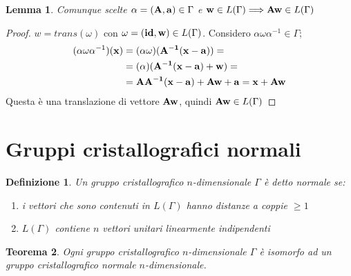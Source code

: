 \documentclass[a4paper,11pt,openright,twoside	]{book}
\newtheorem{definition}{Definizione}[section]
\newtheorem{theorem}{Teorema}[section]
\newtheorem{lemma}[theorem]{Lemma}
\begin{document}
\begin{lemma}
\label{lemma:aw}
Comunque scelte $\alpha = (\vb{A, a}) \in \Gamma$ e $\vb{w} \in L(\Gamma) \Longrightarrow \vb{Aw} \in L(\Gamma)$ 
\end{lemma}

\begin{proof}
$w = trans(\omega)$ con $\omega = (\vb{id, w}	) \in L(\Gamma)$. 
Considero $\alpha \omega \alpha^{-1} \in \Gamma$; 
\[ \begin{split}
( \alpha \omega \alpha^{-1} )(\vb{x}) & = ( \alpha \omega)(\vb{A^{-1}(x-a)}) = \\
& =  ( \alpha  )(\vb{A^{-1}(x-a)} + \vb{w}) = \\
& = \vb{AA^{-1}(x-a)} + \vb{Aw} + \vb{a} = \vb{x} + \vb{Aw} 
\end{split}\] 
Questa è una translazione di vettore $\vb{Aw}$, quindi $\vb{Aw} \in L(\Gamma)$
\end{proof}


\section{Gruppi cristallografici normali}

\begin{definition}
Un gruppo cristallografico $n$-dimensionale $\Gamma$ è detto normale se:
\begin{enumerate}
\item i vettori che sono contenuti in $L(\Gamma)$ hanno distanze a coppie $\geq 1$
\item $L(\Gamma)$ contiene $n$ vettori unitari linearmente indipendenti
\end{enumerate}
\end{definition}


\begin{theorem}
Ogni gruppo cristallografico $n$-dimensionale $\Gamma$ è isomorfo ad un gruppo cristallografico normale $n$-dimensionale.
\end{theorem}
\end{document}
